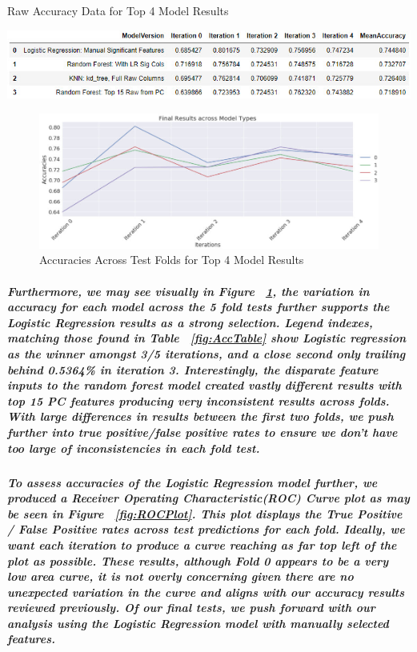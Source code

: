 \documentclass{article}
\begin{document}
\subparagraph{}
\begin{table}[H]
\centering
\caption{Raw Accuracy Data for Top 4 Model Results}
\includegraphics[width=\linewidth]{AccTable.jpg}
\label{fig:AccTable}
\end{table}

\begin{figure}[H]
\centering
\includegraphics[width=\linewidth]{AccPlot.jpg}
\caption{Accuracies Across Test Folds for Top 4 Model Results}
\label{fig:AccPlot}
\end{figure}

\subparagraph{Furthermore, we may see visually in Figure ~\ref{fig:AccPlot}, the variation in accuracy for each model across the 5 fold tests further supports the Logistic Regression results as a strong selection. Legend indexes, matching those found in Table ~\ref{fig:AccTable} show Logistic regression as the winner amongst 3/5 iterations, and a close second only trailing behind 0.5364\% in iteration 3. Interestingly, the disparate feature inputs to the random forest model created vastly different results with top 15 PC features producing very inconsistent results across folds. With large differences in results between the first two folds, we push further into true positive/false positive rates to ensure we don't have too large of inconsistencies in each fold test.}

\subparagraph{To assess accuracies of the Logistic Regression model further, we produced a Receiver Operating Characteristic(ROC) Curve plot as may be seen in Figure ~\ref{fig:ROCPlot}. This plot displays the True Positive / False Positive rates across test predictions for each fold. Ideally, we want each iteration to produce a curve reaching as far top left of the plot as possible. These results, although Fold 0 appears to be a very low area curve, it is not overly concerning given there are no unexpected variation in the curve and aligns with our accuracy results reviewed previously. Of our final tests, we push forward with our analysis using the Logistic Regression model with manually selected features.}
\end{document}
